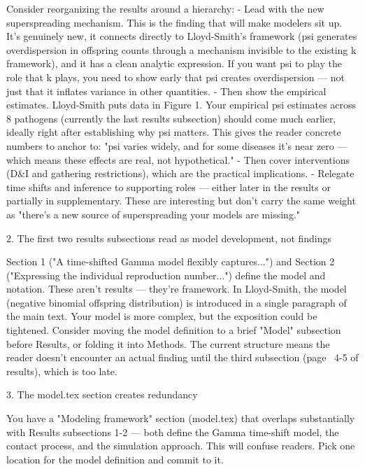   Consider reorganizing the results around a hierarchy:
  - Lead with the new superspreading mechanism. This is the finding that will make modelers sit up.
  It's genuinely new, it connects directly to Lloyd-Smith's framework (psi generates overdispersion
  in offspring counts through a mechanism invisible to the existing k framework), and it has a clean
  analytic expression. If you want psi to play the role that k plays, you need to show early that psi
   creates overdispersion --- not just that it inflates variance in other quantities.
  - Then show the empirical estimates. Lloyd-Smith puts data in Figure 1. Your empirical psi
  estimates across 8 pathogens (currently the last results subsection) should come much earlier,
  ideally right after establishing why psi matters. This gives the reader concrete numbers to anchor
  to: "psi varies widely, and for some diseases it's near zero --- which means these effects are
  real, not hypothetical."
  - Then cover interventions (D&I and gathering restrictions), which are the practical implications.
  - Relegate time shifts and inference to supporting roles --- either later in the results or
  partially in supplementary. These are interesting but don't carry the same weight as "there's a new
   source of superspreading your models are missing."

  2. The first two results subsections read as model development, not findings

  Section 1 ("A time-shifted Gamma model flexibly captures...") and Section 2 ("Expressing the
  individual reproduction number...") define the model and notation. These aren't results --- they're
   framework. In Lloyd-Smith, the model (negative binomial offspring distribution) is introduced in a
   single paragraph of the main text. Your model is more complex, but the exposition could be
  tightened. Consider moving the model definition to a brief "Model" subsection before Results, or
  folding it into Methods. The current structure means the reader doesn't encounter an actual finding
   until the third subsection (page ~4-5 of results), which is too late.

  3. The model.tex section creates redundancy

  You have a "Modeling framework" section (model.tex) that overlaps substantially with Results
  subsections 1-2 --- both define the Gamma time-shift model, the contact process, and the simulation
   approach. This will confuse readers. Pick one location for the model definition and commit to it.

